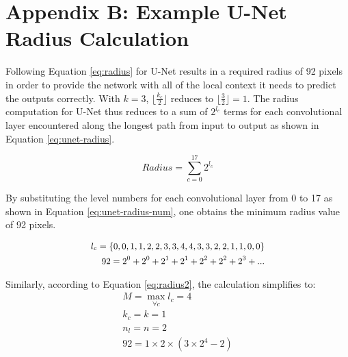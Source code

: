 \section{Appendix B: Example U-Net Radius Calculation}

Following Equation \ref{eq:radius} for U-Net results in a required radius of 92 pixels in order to provide the network with all of the local context it needs to predict the outputs correctly. With $k = 3$, $\lfloor \frac{k_c}{2} \rfloor$ reduces to $\lfloor \frac{3}{2} \rfloor = 1$. The radius computation for U-Net thus reduces to a sum of $2^{l_c}$ terms for each convolutional layer encountered along the longest path from input to output as shown in Equation \ref{eq:unet-radius}. 

\begin{equation}
Radius = \sum_{c=0}^{17} 2^{l_c}
\label{eq:unet-radius}
\end{equation}

By substituting the level numbers for each convolutional layer from 0 to 17 as shown in Equation \ref{eq:unet-radius-num}, one obtains the minimum radius value of 92 pixels. 

\begin{equation}
\begin{small}
\begin{aligned} 
l_c = \{0, 0, 1, 1, 2, 2, 3, 3, 4, 4, 3, 3, 2, 2, 1, 1, 0, 0\} \\
92 = 2^0 + 2^0 + 2^1 + 2^1 + 2^2 + 2^2 + 2^3 + ...
\end{aligned}
\end{small}
\label{eq:unet-radius-num}
\end{equation}

Similarly, according to Equation \ref{eq:radius2}, the calculation simplifies to:
\begin{equation}
\begin{aligned} 
M=\max_{\forall c} { l_c } = 4\\
k_c = k = 1  \\
n_l = n = 2 \\
92 = 1 \times 2 \times (3 \times 2^4 - 2)
\end{aligned}
\label{eq:unet-radius-num2}
\end{equation}



%

